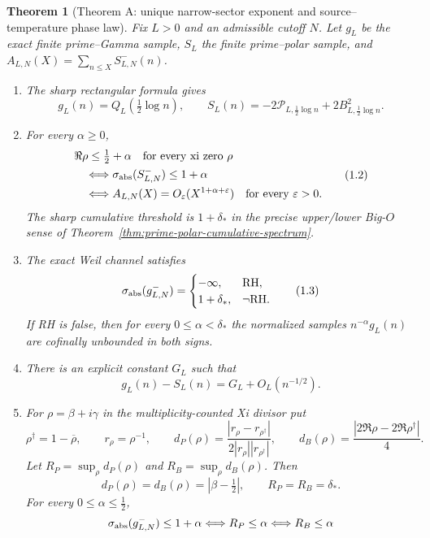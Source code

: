 \documentclass[11pt]{article}
\newtheorem{theorem}{Theorem}[section]
\begin{document}
\begin{theorem}[Theorem A: unique narrow-sector exponent and source--temperature phase law]
\label{thm:main}
Fix $L>0$ and an admissible cutoff $N$.  Let $g_L$ be the exact finite
prime--Gamma sample, $S_L$ the finite prime--polar sample, and
$A_{L,N}(X)=\sum_{n\le X}S_{L,N}^-(n)$.
\begin{enumerate}[label=\textup{(\roman*)}]
\item The sharp rectangular formula gives
\[
 g_L(n)=Q_L\!\left(\tfrac12\log n\right),\qquad
 S_L(n)=-2\mathcal P_{L,\frac12\log n}
          +2B_{L,\frac12\log n}^{2}.
 \tag{1.1}
\]
\item For every $\alpha\ge0$,
\[
 \begin{aligned}
 &\Re\rho\le\tfrac12+\alpha\quad\text{for every xi zero }\rho\\
 &\quad\Longleftrightarrow
 \sigma_{\rm abs}(S_{L,N}^-)\le1+\alpha\\
 &\quad\Longleftrightarrow
 A_{L,N}(X)=O_\varepsilon(X^{1+\alpha+\varepsilon})
 \quad\text{for every }\varepsilon>0.
 \end{aligned}
 \tag{1.2}
\]
The sharp cumulative threshold is $1+\delta_*$ in the precise upper/lower Big-$O$ sense of
Theorem~\ref{thm:prime-polar-cumulative-spectrum}.
\item The exact Weil channel satisfies
\[
 \sigma_{\rm abs}(g_{L,N}^-)=
 \begin{cases}
 -\infty,&\mathrm{RH},\\
 1+\delta_*,&\neg\mathrm{RH}.
 \end{cases}
 \tag{1.3}
\]
If RH is false, then for every $0\le\alpha<\delta_*$ the normalized samples
$n^{-\alpha}g_L(n)$ are cofinally unbounded in both signs.
\item There is an explicit constant $G_L$ such that
\[
 g_L(n)-S_L(n)=G_L+O_L(n^{-1/2}).
 \tag{1.4}
\]
\item For $\rho=\beta+i\gamma$ in the multiplicity-counted Xi divisor put
\[
 \rho^\dagger=1-\overline\rho,\qquad r_\rho=\rho^{-1},\qquad
 d_P(\rho)=\frac{|r_\rho-r_{\rho^\dagger}|}
 {2|r_\rho||r_{\rho^\dagger}|},
 \qquad d_B(\rho)=\frac{|2\Re\rho-2\Re\rho^\dagger|}{4}.
 \tag{1.5}
\]
Let $R_P=\sup_\rho d_P(\rho)$ and $R_B=\sup_\rho d_B(\rho)$.  Then
\[
 d_P(\rho)=d_B(\rho)=|\beta-\tfrac12|,
 \qquad R_P=R_B=\delta_*.
 \tag{1.6}
\]
For every $0\le\alpha\le\frac12$,
\[
 \begin{aligned}
 \sigma_{\rm abs}(g_{L,N}^-)\le1+\alpha
 &\Longleftrightarrow R_P\le\alpha
 \Longleftrightarrow R_B\le\alpha\\

\end{aligned}\]
\end{enumerate}
\end{theorem}
\end{document}

